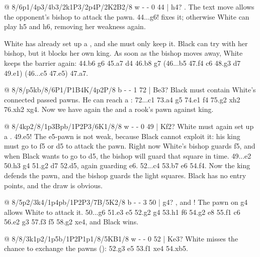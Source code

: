 @ 8/6p1/4p3/4b3/2k1P3/2p4P/2K2B2/8 w - - 0 44 | h4?
. The text
move allows the opponent's bishop to attack the pawn. 44...g6! fixes it; otherwise White can play
h5 and h6, removing her weakness again.

White has already set up a , and she must only keep it. Black
can try  with her bishop, but it blocks her own king.
As soon as the bishop moves away, White keeps the barrier again: 44.\B b6 g6 45.\B a7 \B d4
46.\B b8 \B g7 (46...\K b5 47.\B f4 \K c6 48.\B g3 \K d7 49.\B e1) (46...\B c5 47.\B e5)
47.\B a7.

@ 8/8/p5kb/8/6P1/P1B4K/4p2P/8 b - - 1 72 | Be3?
Black must contain White's connected passed pawns. He can reach a
: 72...\B c1 73.a4 \K g5 74.\B e1 \B f4
75.\K g2 \B xh2 76.\K xh2 \K xg4. Now we have again the  and a rook's pawn
against king.

@ 8/4kp2/8/1p3Bpb/1P2P3/6K1/8/8 w - - 0 49 | Kf2?
White must again set up a . 49.e5! The e5-pawn is not
weak, because Black cannot exploit it: his king must go to f5 or d5 to attack the pawn. Right now
White's bishop guards f5, and when Black wants to go to d5, the bishop will guard that square in
time. 49...\B e2 50.\B h3 g4 51.\B g2 \K d7 52.\B d5, again guarding e6. 52...\B c4 53.\B b7
\K e6 54.\K f4. Now the king defends the pawn, and the bishop guards the light squares. Black has
no entry points, and the draw is obvious.

@ 8/5p2/3k4/1p4pb/1P2P3/7B/5K2/8 b - - 3 50 | g4?
, and
! The pawn on g4 allows White to
attack it. 50...\B g6 51.\K e3 \K e5 52.\B g2 g4 53.\B h1 f6 54.\B g2 \B e8 55.\B f1 \B c6
56.\B e2 g3 57.\B f3 f5 58.\B g2 \B xe4, and Black wins.

@ 8/8/3k1p2/1p5b/1P2P1p1/8/5KB1/8 w - - 0 52 | Ke3?
White misses the chance to exchange the pawns
():
52.\K g3 \K e5 53.\B f1 \K xe4 54.\B xb5.

